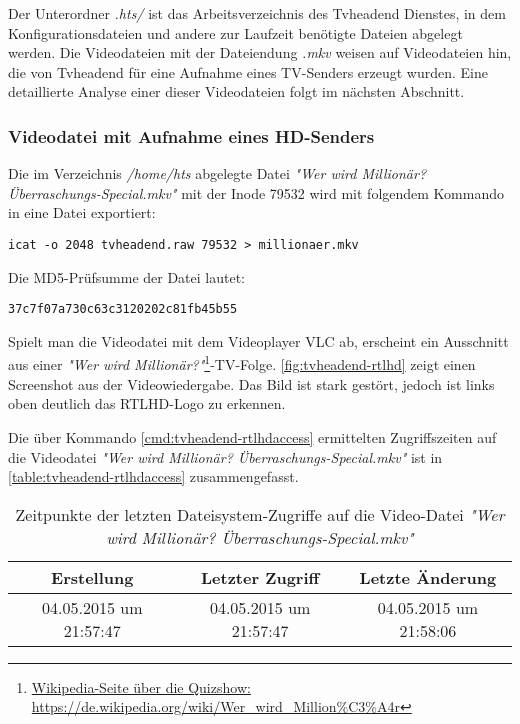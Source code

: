 Der Unterordner \textit{.hts/} ist das Arbeitsverzeichnis des Tvheadend Dienstes, in dem Konfigurationsdateien und andere zur Laufzeit benötigte Dateien abgelegt werden. Die Videodateien mit der Dateiendung \textit{.mkv} weisen auf Videodateien hin, die von Tvheadend für eine Aufnahme eines TV-Senders erzeugt wurden. Eine detaillierte Analyse einer dieser Videodateien folgt im nächsten Abschnitt.

\subsubsection{Videodatei mit Aufnahme eines HD-Senders}

Die im Verzeichnis \textit{/home/hts} abgelegte Datei \textit{"Wer wird Millionär? Überraschungs-Special.mkv"} mit der Inode 79532 wird mit folgendem Kommando in eine Datei exportiert:

\begin{verbatim}
icat -o 2048 tvheadend.raw 79532 > millionaer.mkv
\end{verbatim}

Die MD5-Prüfsumme der Datei lautet:

\begin{verbatim}
37c7f07a730c63c3120202c81fb45b55
\end{verbatim}

Spielt man die Videodatei mit dem Videoplayer VLC ab, erscheint ein Ausschnitt aus einer \textit{"Wer wird 	Millionär?"}\footnote{\href{https://de.wikipedia.org/wiki/Wer\_wird\_Million\%C3\%A4r}{Wikipedia-Seite über die Quizshow: https://de.wikipedia.org/wiki/Wer\_wird\_Million\%C3\%A4r}}-TV-Folge. \autoref{fig:tvheadend-rtlhd} zeigt einen Screenshot aus der Videowiedergabe. Das Bild ist stark gestört, jedoch ist links oben deutlich das RTLHD-Logo zu erkennen.

Die über Kommando \autoref{cmd:tvheadend-rtlhdaccess} ermittelten Zugriffszeiten auf die Videodatei \textit{"Wer wird Millionär? Überraschungs-Special.mkv"} ist in \autoref{table:tvheadend-rtlhdaccess} zusammengefasst.

\begin{table}[H]
\begin{tabular}{ccc}
\hline 
Erstellung & Letzter Zugriff & Letzte Änderung \\ 
\hline 
04.05.2015 um 21:57:47 & 04.05.2015 um 21:57:47 & 04.05.2015 um 21:58:06 \\ 
\hline 
\end{tabular}
\caption{Zeitpunkte der letzten Dateisystem-Zugriffe auf die Video-Datei \textit{"Wer wird Millionär? Überraschungs-Special.mkv"}}
\label{table:tvheadend-rtlhdaccess}
\end{table}

